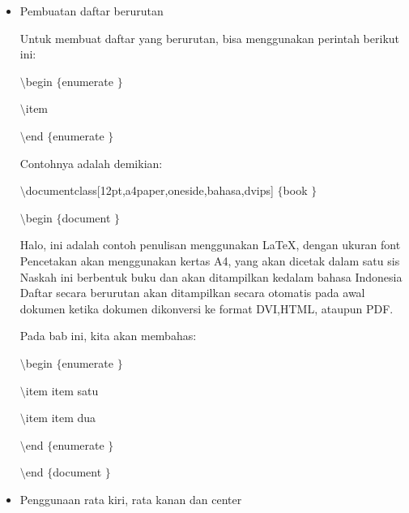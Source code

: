 \begin{itemize}
\noindent 
\vspace{8pt} 
\item Pembuatan daftar berurutan \par
Untuk membuat daftar yang berurutan, bisa menggunakan perintah berikut ini: \par
{\fontsize{10pt}{10pt}\selectfont  $  \setminus  $begin $  \{  $enumerate $  \}  $} \par
{\fontsize{10pt}{10pt}\selectfont  $  \setminus  $item} \par
{\fontsize{10pt}{10pt}\selectfont  $  \setminus  $end $  \{  $enumerate $  \}  $} \par
\vspace{12pt}
Contohnya adalah demikian: \par
{\fontsize{10pt}{10pt}\selectfont  $  \setminus  $documentclass[12pt,a4paper,oneside,bahasa,dvips] $  \{  $book $  \}  $} \par
{\fontsize{10pt}{10pt}\selectfont  $  \setminus  $begin $  \{  $document $  \}  $} \par
\vspace{10pt}
{\fontsize{10pt}{10pt}\selectfont Halo, ini adalah contoh penulisan menggunakan LaTeX, dengan ukuran font Pencetakan akan menggunakan kertas A4, yang akan dicetak dalam satu sis Naskah ini berbentuk buku dan akan ditampilkan kedalam bahasa Indonesia Daftar secara berurutan akan ditampilkan secara otomatis pada awal {\fontsize{9pt}{9pt}\selectfont dokumen ketika dokumen dikonversi ke format DVI,HTML, ataupun PDF.}} \par
\vspace{12pt}
{\fontsize{10pt}{10pt}\selectfont Pada bab ini, kita akan membahas:} \par
{\fontsize{10pt}{10pt}\selectfont  $  \setminus  $begin $  \{  $enumerate $  \}  $} \par
{\fontsize{10pt}{10pt}\selectfont  $  \setminus  $item item satu} \par
{\fontsize{10pt}{10pt}\selectfont  $  \setminus  $item item dua} \par
{\fontsize{10pt}{10pt}\selectfont  $  \setminus  $end $  \{  $enumerate $  \}  $} \par
{\fontsize{10pt}{10pt}\selectfont  $  \setminus  $end $  \{  $document $  \}  $} \par
\vspace{10pt}
\noindent 
\vspace{12pt}
\item Penggunaan rata kiri, rata kanan dan center \par

\end{itemize}
